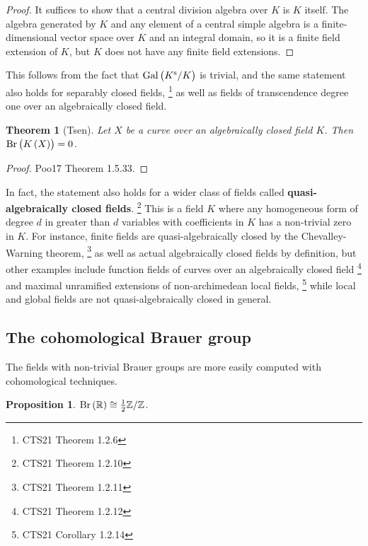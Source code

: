 \documentclass{article}
\newtheorem*{proposition}{Proposition}
\newtheorem*{theorem}{Theorem}
\newcommand{\br}{\del}
\newcommand{\Br}{\mathrm{Br}}
\newcommand{\Gal}{\mathrm{Gal}}
\newcommand{\RR}{\mathbb{R}}
\newcommand{\s}{\mathrm{s}}
\newcommand{\ZZ}{\mathbb{Z}}
\begin{document}
\begin{proof}
It suffices to show that a central division algebra over $ K $ is $ K $ itself. The algebra generated by $ K $ and any element of a central simple algebra is a finite-dimensional vector space over $ K $ and an integral domain, so it is a finite field extension of $ K $, but $ K $ does not have any finite field extensions.
\end{proof}

This follows from the fact that $ \Gal\br{K^\s / K} $ is trivial, and the same statement also holds for separably closed fields, \footnote{CTS21 Theorem 1.2.6} as well as fields of transcendence degree one over an algebraically closed field.

\begin{theorem}[Tsen]
Let $ X $ be a curve over an algebraically closed field $ K $. Then $ \Br\br{K\br{X}} = 0 $.
\end{theorem}

\begin{proof}
Poo17 Theorem 1.5.33.
\end{proof}

In fact, the statement also holds for a wider class of fields called \textbf{quasi-algebraically closed fields}. \footnote{CTS21 Theorem 1.2.10} This is a field $ K $ where any homogeneous form of degree $ d $ in greater than $ d $ variables with coefficients in $ K $ has a non-trivial zero in $ K $. For instance, finite fields are quasi-algebraically closed by the Chevalley-Warning theorem, \footnote{CTS21 Theorem 1.2.11} as well as actual algebraically closed fields by definition, but other examples include function fields of curves over an algebraically closed field \footnote{CTS21 Theorem 1.2.12} and maximal unramified extensions of non-archimedean local fields, \footnote{CTS21 Corollary 1.2.14} while local and global fields are not quasi-algebraically closed in general.

\pagebreak

\subsection{The cohomological Brauer group}

The fields with non-trivial Brauer groups are more easily computed with cohomological techniques.

\begin{proposition}
$ \Br\br{\RR} \cong \tfrac{1}{2}\ZZ / \ZZ $.
\end{proposition}
\end{document}
